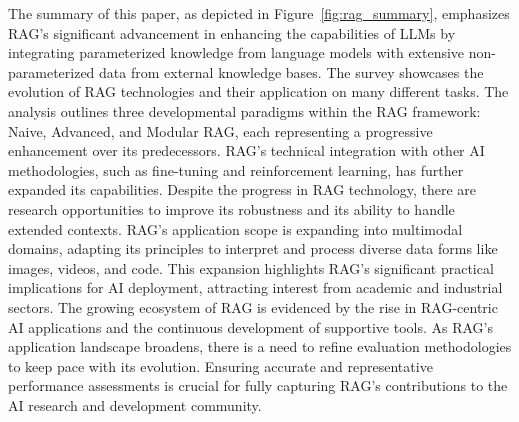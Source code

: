 \label{sec:conclusion}
The summary of this paper, as depicted in Figure~\ref{fig:rag_summary}, emphasizes RAG's significant advancement in enhancing the capabilities of LLMs by integrating parameterized knowledge from language models with extensive non-parameterized data from external knowledge bases. The survey showcases the evolution of RAG technologies and their application on many different tasks. The analysis outlines three developmental paradigms within the RAG framework: Naive, Advanced, and Modular RAG, each representing a progressive enhancement over its predecessors. RAG's technical integration with other AI methodologies, such as fine-tuning and reinforcement learning, has further expanded its capabilities. Despite the progress in RAG technology, there are research opportunities to improve its robustness and its ability to handle extended contexts. RAG's application scope is expanding into multimodal domains, adapting its principles to interpret and process diverse data forms like images, videos, and code. This expansion highlights RAG's significant practical implications for AI deployment, attracting interest from academic and industrial sectors. The growing ecosystem of RAG is evidenced by the rise in RAG-centric AI applications and the continuous development of supportive tools. As RAG's application landscape broadens, there is a need to refine evaluation methodologies to keep pace with its evolution. Ensuring accurate and representative performance assessments is crucial for fully capturing RAG's contributions to the AI research and development community.


\vfill
